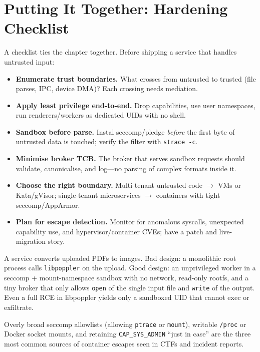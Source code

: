 \section{Putting It Together: Hardening Checklist}
\label{sec:hardening-checklist}
A checklist ties the chapter together. Before shipping a service that handles untrusted input:
\begin{itemize}[leftmargin=*, itemsep=0.35em]
    \item \textbf{Enumerate trust boundaries.} What crosses from untrusted to trusted (file parses, IPC, device DMA)? Each crossing needs mediation.
    \item \textbf{Apply least privilege end-to-end.} Drop capabilities, use user namespaces, run renderers/workers as dedicated UIDs with no shell.
    \item \textbf{Sandbox before parse.} Instal seccomp/pledge \emph{before} the first byte of untrusted data is touched; verify the filter with \texttt{strace -c}.
    \item \textbf{Minimise broker TCB.} The broker that serves sandbox requests should validate, canonicalise, and log---no parsing of complex formats inside it.
    \item \textbf{Choose the right boundary.} Multi-tenant untrusted code $\to$ VMs or Kata/gVisor; single-tenant microservices $\to$ containers with tight seccomp/AppArmor.
    \item \textbf{Plan for escape detection.} Monitor for anomalous syscalls, unexpected capability use, and hypervisor/container CVEs; have a patch and live-migration story.
\end{itemize}
\begin{example}
A service converts uploaded PDFs to images. Bad design: a monolithic root process calls \texttt{libpoppler} on the upload. Good design: an unprivileged worker in a seccomp + mount-namespace sandbox with no network, read-only rootfs, and a tiny broker that only allows \texttt{open} of the single input file and \texttt{write} of the output. Even a full RCE in libpoppler yields only a sandboxed UID that cannot exec or exfiltrate.
\end{example}
\begin{remark}
Overly broad seccomp allowlists (allowing \texttt{ptrace} or \texttt{mount}), writable \texttt{/proc} or Docker socket mounts, and retaining \texttt{CAP\_SYS\_ADMIN} ``just in case'' are the three most common sources of container escapes seen in CTFs and incident reports.
\end{remark}
